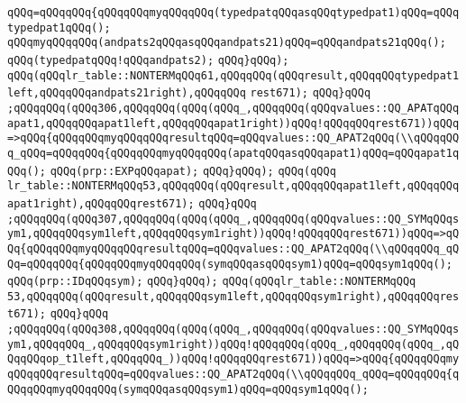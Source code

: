 \verb|qQQq=qQQqqQQq{qQQqqQQqmyqQQqqQQq(typedpatqQQqasqQQqtypedpat1)qQQq=qQQqtypedpat1qQQq();|\newline
\verb|qQQqmyqQQqqQQq(andpats2qQQqasqQQqandpats21)qQQq=qQQqandpats21qQQq();|\newline
\verb|qQQq(typedpatqQQq!qQQqandpats2);|\newline
\verb|qQQq}qQQq);|\newline
\verb|qQQq(qQQqlr_table::NONTERMqQQq61,qQQqqQQq(qQQqresult,qQQqqQQqtypedpat1left,qQQqqQQqandpats21right),qQQqqQQq|\newline
\verb|rest671);|\newline
\verb|qQQq}qQQq|\newline
\verb|;qQQqqQQq(qQQq306,qQQqqQQq(qQQq(qQQq_,qQQqqQQq(qQQqvalues::QQ_APATqQQqapat1,qQQqqQQqapat1left,qQQqqQQqapat1right))qQQq!qQQqqQQqrest671))qQQq=>qQQq{qQQqqQQqmyqQQqqQQqresultqQQq=qQQqvalues::QQ_APAT2qQQq(\\qQQqqQQq_qQQq=qQQqqQQq{qQQqqQQqmyqQQqqQQq(apatqQQqasqQQqapat1)qQQq=qQQqapat1qQQq();|\newline
\verb|qQQq(prp::EXPqQQqapat);|\newline
\verb|qQQq}qQQq);|\newline
\verb|qQQq(qQQq|\newline
\verb|lr_table::NONTERMqQQq53,qQQqqQQq(qQQqresult,qQQqqQQqapat1left,qQQqqQQqapat1right),qQQqqQQqrest671);|\newline
\verb|qQQq}qQQq|\newline
\verb|;qQQqqQQq(qQQq307,qQQqqQQq(qQQq(qQQq_,qQQqqQQq(qQQqvalues::QQ_SYMqQQqsym1,qQQqqQQqsym1left,qQQqqQQqsym1right))qQQq!qQQqqQQqrest671))qQQq=>qQQq{qQQqqQQqmyqQQqqQQqresultqQQq=qQQqvalues::QQ_APAT2qQQq(\\qQQqqQQq_qQQq=qQQqqQQq{qQQqqQQqmyqQQqqQQq(symqQQqasqQQqsym1)qQQq=qQQqsym1qQQq();|\newline
\verb|qQQq(prp::IDqQQqsym);|\newline
\verb|qQQq}qQQq);|\newline
\verb|qQQq(qQQqlr_table::NONTERMqQQq|\newline
\verb|53,qQQqqQQq(qQQqresult,qQQqqQQqsym1left,qQQqqQQqsym1right),qQQqqQQqrest671);|\newline
\verb|qQQq}qQQq|\newline
\verb|;qQQqqQQq(qQQq308,qQQqqQQq(qQQq(qQQq_,qQQqqQQq(qQQqvalues::QQ_SYMqQQqsym1,qQQqqQQq_,qQQqqQQqsym1right))qQQq!qQQqqQQq(qQQq_,qQQqqQQq(qQQq_,qQQqqQQqop_t1left,qQQqqQQq_))qQQq!qQQqqQQqrest671))qQQq=>qQQq{qQQqqQQqmyqQQqqQQqresultqQQq=qQQqvalues::QQ_APAT2qQQq(\\qQQqqQQq_qQQq=qQQqqQQq{qQQqqQQqmyqQQqqQQq(symqQQqasqQQqsym1)qQQq=qQQqsym1qQQq();|\newline
